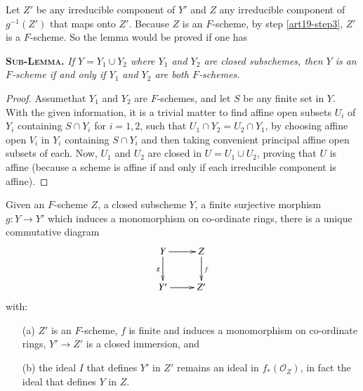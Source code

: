 Let $Z'$ be any irreducible component of $Y'$ and $Z$ any irreducible component of $g^{-1}(Z')$ that maps onto $Z'$. Because $Z$ is an $F$-scheme, by step \ref{art19-step3}, $Z'$ is a $F$-scheme. So the lemma would be proved if one has 


\vskip 0.4cm
\textsc{\bf Sub-Lemma.} {\em If $Y = Y_1 \cup Y_2$ where $Y_1$ and $Y_2$ are closed subschemes, then $Y$ is an $F$-scheme if and only if $Y_1$ and $Y_2$ are both $F$-schemes.}

\begin{proof}
Assume\pageoriginale that $Y_1$ and $Y_2$ are $F$-schemes, and let $S$ be any finite set in $Y$. With the given information, it is a trivial matter to find affine open subsets $U_i$ of $Y_i$ containing $S \cap Y_i$ for $i = 1, 2$, such that $U_1 \cap Y_2 = U_2 \cap Y_1$, by choosing affine open $V_i$ in $Y_i$ containing $S \cap Y_i$ and then taking convenient principal affine open subsets of each. Now, $U_1$ and $U_2$ are closed in $U = U_1 \cup U_2$, proving that $U$ is affine (because a scheme is affine if and only if each irreducible component is affine).
\end{proof}

\begin{prop*}
Given an $F$-scheme $Z$, a closed subscheme $Y$, a finite surjective morphism $g: Y \to Y'$ which induces a monomorphism on co-ordinate rings, there is a unique commutative diagram
\[
\xymatrix{
Y \ar[r] \ar[d]_g & Z \ar[d]^f\\
Y' \ar[r] & Z'
}
\]
with:
\begin{itemize}
\item[(a)] $Z'$ is an $F$-scheme, $f$ is finite and induces a monomorphism on co-ordinate rings, $Y' \to Z'$ is a closed immersion, and 

\item[(b)] the ideal $I$ that defines $Y'$ in $Z'$ remains an ideal in $f_*(\mathcal{O}_Z)$, in fact the ideal that defines $Y$ in $Z$.
\end{itemize}
\end{prop*}

